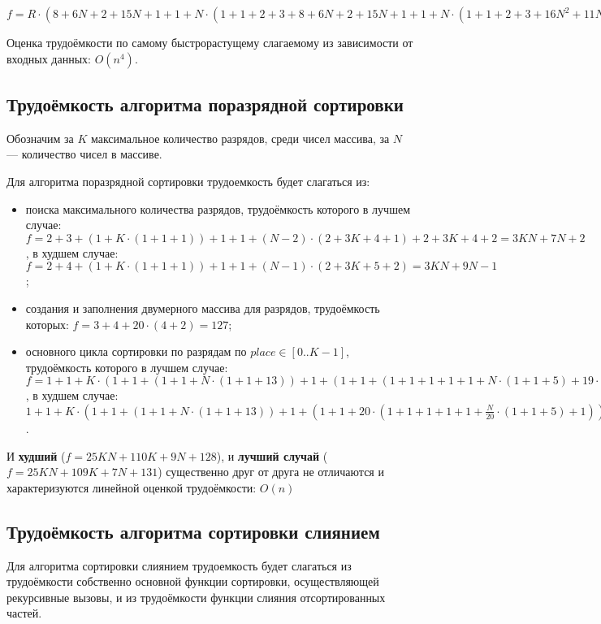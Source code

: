 $f = R \cdot (8 + 6N + 2 + 15N + 1 + 1 + N \cdot (1 + 1 + 2 + 3 + 8 + 6N + 2 + 15N + 1 + 1 + N \cdot (1 + 1 + 2 + 3 + 16N^2 + 11N + 2)) + 1 + 7N^2 + 6N + 2) = 16N^4R + 11N^3R + 37N^2R + 46NR + 15R$

Оценка трудоёмкости по самому быстрорастущему слагаемому из зависимости от входных данных: $O(n^4)$.

\subsection{Трудоёмкость алгоритма поразрядной сортировки}

Обозначим за $K$ максимальное количество разрядов, среди чисел массива, за $N$ --- количество чисел в массиве. 

Для алгоритма поразрядной сортировки трудоемкость будет слагаться из:

\begin{itemize}
	\item[---] поиска максимального количества разрядов, трудоёмкость которого в лучшем случае: $f = 2 + 3 + (1 + K \cdot (1 + 1 + 1)) + 1 + 1 + (N - 2) \cdot (2 + 3K + 4 + 1) + 2 + 3K + 4 + 2 = 3KN + 7N + 2$, в худшем случае: $f = 2 + 4 + (1 + K \cdot (1 + 1 + 1)) + 1 + 1 + (N - 1) \cdot (2 + 3K + 5 + 2) = 3KN + 9N - 1$;
	\item[---] создания и заполнения двумерного массива для разрядов, трудоёмкость которых: $f = 3 + 4 + 20 \cdot (4 + 2) = 127$;
	\item[---] основного цикла сортировки по разрядам по $place \in [0..K-1]$, трудоёмкость которого в лучшем случае: $f = 1 + 1 + K \cdot (1 + 1 + (1 + 1 + N \cdot (1 + 1 + 13)) + 1 + (1 + 1 + (1 + 1 + 1 + 1 + 1 + N \cdot (1 + 1 + 5) + 19 \cdot (1 + 1 + 1)) + 40)) = 22KN + 109K + 2$, в худшем случае: $1 + 1 + K \cdot (1 + 1 + (1 + 1 + N \cdot (1 + 1 + 13)) + 1 + (1 + 1 + 20 \cdot (1 + 1 + 1 + 1 + 1 + \frac{N}{20} \cdot (1 + 1 + 5) + 1))) = 22KN + 110K + 2$.
\end{itemize}

И \textbf{худший} ($f = 25KN + 110K + 9N + 128$), и \textbf{лучший случай} ($f = 25KN + 109K + 7N + 131$) существенно друг от друга не отличаются и характеризуются линейной оценкой трудоёмкости: $O(n)$


\subsection{Трудоёмкость алгоритма сортировки слиянием}

Для алгоритма сортировки слиянием трудоемкость будет слагаться из трудоёмкости собственно основной функции сортировки, осуществляющей рекурсивные вызовы, и из трудоёмкости функции слияния отсортированных частей.

